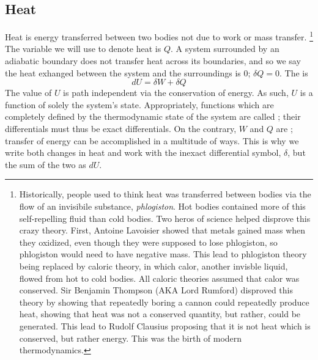 \documentclass[12pt]{article}
\begin{document}
\subsection{Heat}
Heat is energy transferred between two bodies not due to work or mass transfer.
\footnote{Historically, people used to think heat was transferred between bodies via the flow of an invisibile substance, \textit{phlogiston}. Hot bodies contained more of this self-repelling fluid than cold bodies. Two heros of science helped disprove this crazy theory. First, Antoine Lavoisier showed that metals gained mass when they oxidized, even though they were supposed to lose phlogiston, so phlogiston would need to have negative mass. This lead to phlogiston theory being replaced by caloric theory, in which calor, another invisble liquid, flowed from hot to cold bodies. All caloric theories assumed that calor was conserved. Sir Benjamin Thompson (AKA Lord Rumford) disproved this theory by showing that repeatedly boring a cannon could repeatedly produce heat, showing that heat was not a conserved quantity, but rather, could be generated. This lead to Rudolf Clausius proposing that it is not heat which is conserved, but rather energy. This was the birth of modern thermodynamics.}  The variable we will use to denote heat is $Q$.  A system surrounded by an adiabatic boundary does not transfer heat across its boundaries, and so we say the heat exhanged between the system and the surroundings is 0; $\delta Q = 0$.  The  is
\begin{equation}\boxed{
dU = \delta W + \delta Q
}\end{equation}
The value of $U$ is path independent via the conservation of energy. As such, $U$ is a function of solely the system's state. Appropriately, functions which are completely defined by the thermodynamic state of the system are called ; their differentials must thus be exact differentials. On the contrary, $W$ and $Q$ are ; transfer of energy can be accomplished in a multitude of ways.  This is why we write both changes in heat and work with the inexact differential symbol, $\delta$, but the sum of the two as $dU$.
\end{document}
